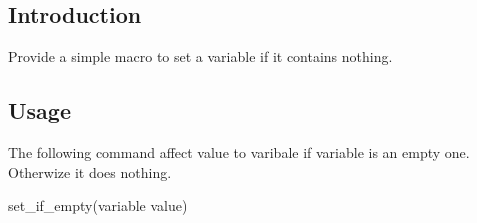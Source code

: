 \subsection*{Introduction}

Provide a simple macro to set a variable if it contains nothing.

\subsection*{Usage}

The following command affect value to varibale if variable is an empty one. Otherwize it does nothing. \begin{DoxyVerb}set_if_empty(variable value) \end{DoxyVerb}
 